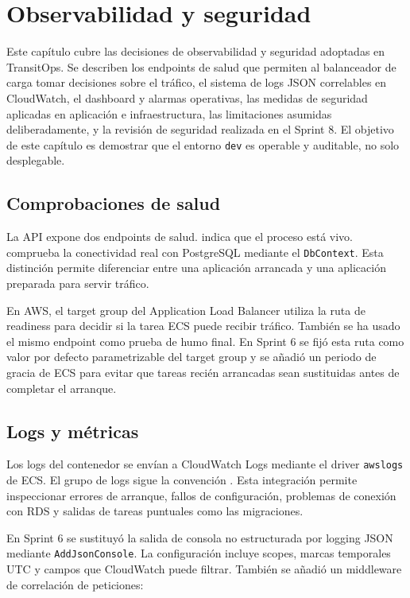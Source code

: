 \chapter{Observabilidad y seguridad}
\label{chap:observabilidad-seguridad}

Este capítulo cubre las decisiones de observabilidad y seguridad adoptadas en TransitOps. Se describen los endpoints de salud que permiten al balanceador de carga tomar decisiones sobre el tráfico, el sistema de logs JSON correlables en CloudWatch, el dashboard y alarmas operativas, las medidas de seguridad aplicadas en aplicación e infraestructura, las limitaciones asumidas deliberadamente, y la revisión de seguridad realizada en el Sprint 8. El objetivo de este capítulo es demostrar que el entorno \texttt{dev} es operable y auditable, no solo desplegable.

\section{Comprobaciones de salud}
\label{sec:health-checks}

La API expone dos endpoints de salud.  indica que el proceso está vivo.  comprueba la conectividad real con PostgreSQL mediante el \texttt{DbContext}. Esta distinción permite diferenciar entre una aplicación arrancada y una aplicación preparada para servir tráfico.

En AWS, el target group del Application Load Balancer utiliza la ruta de readiness para decidir si la tarea ECS puede recibir tráfico. También se ha usado el mismo endpoint como prueba de humo final. En Sprint 6 se fijó esta ruta como valor por defecto parametrizable del target group y se añadió un periodo de gracia de ECS para evitar que tareas recién arrancadas sean sustituidas antes de completar el arranque.

\section{Logs y métricas}
\label{sec:logs-metricas}

Los logs del contenedor se envían a CloudWatch Logs mediante el driver \texttt{awslogs} de ECS. El grupo de logs sigue la convención . Esta integración permite inspeccionar errores de arranque, fallos de configuración, problemas de conexión con RDS y salidas de tareas puntuales como las migraciones.

En Sprint 6 se sustituyó la salida de consola no estructurada por logging JSON mediante \texttt{AddJsonConsole}. La configuración incluye scopes, marcas temporales UTC y campos que CloudWatch puede filtrar. También se añadió un middleware de correlación de peticiones:

